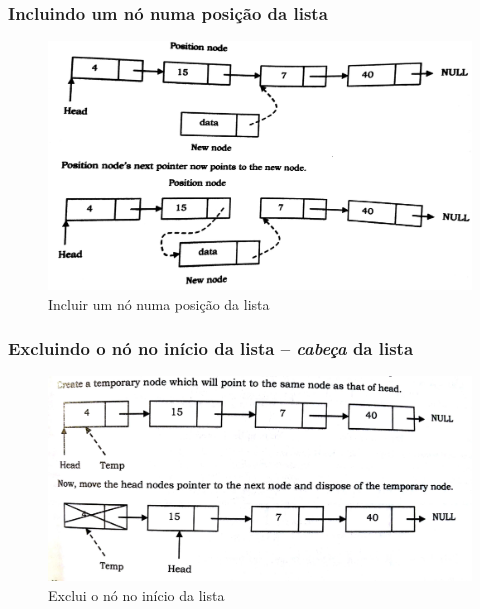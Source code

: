 \begin{frame}%

\frametitle{Incluindo um nó numa posição da  lista}

\begin{figure}[!hb]
	\centering
	\includegraphics[height=0.50\paperheight, width=0.7\paperwidth]{figs/fig_listas/insere_posicao}						
			\caption{Incluir um nó numa posição da lista}	
		\end{figure} 

\end{frame} 

\begin{frame}%

\frametitle{Excluindo o nó no início da lista -- \textit{cabeça} da lista}

\begin{figure}[!hb]
	\centering
	\includegraphics[height=0.50\paperheight, width=0.7\paperwidth]{figs/fig_listas/exclui_inicio}						
			\caption{Exclui o nó no início da lista}	
		\end{figure} 

\end{frame} 

